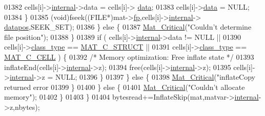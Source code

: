 \begin{DoxyCode}
{{{{{{{{01382                                 cells[i]->\hyperlink{group___m_a_t_a6e97e3ed9f40c49322c18561c2a94e92}{internal}->data = cells[i]->
      \hyperlink{group___m_a_t_a5672978efa230bbdecdf38ede781f7fa}{data};
01383                                 cells[i]->\hyperlink{group___m_a_t_a5672978efa230bbdecdf38ede781f7fa}{data} = NULL;
01384                             \}
01385                             (void)fseek((FILE*)mat->\hyperlink{struct__mat__t_a85f562e407ca9ad4d2a6e14f839432b7}{fp},cells[i]->\hyperlink{group___m_a_t_a6e97e3ed9f40c49322c18561c2a94e92}{internal}->
      \hyperlink{structmatvar__internal_afd3bfaab126a160bd6855563e1ea0a7e}{datapos},SEEK\_SET);
01386                         \} \textcolor{keywordflow}{else} \{
01387                             \hyperlink{group__mat__util_gaf51f2bfbb5580f575e4dd79757e2b80c}{Mat\_Critical}(\textcolor{stringliteral}{"Couldn't determine file position"});
01388                         \}
01389                         \textcolor{keywordflow}{if} ( cells[i]->\hyperlink{namespaceinternal}{internal}->data != NULL ||
01390                              cells[i]->\hyperlink{group___m_a_t_aff13035bf3265dd7d9425e5d40c839d4}{class\_type} == \hyperlink{group___m_a_t_ggad4d60ae7b709fc81bfd744fb4c857c40acb467c7749c80902b798134c729bb521}{MAT\_C\_STRUCT} ||
01391                              cells[i]->\hyperlink{group___m_a_t_aff13035bf3265dd7d9425e5d40c839d4}{class\_type} == \hyperlink{group___m_a_t_ggad4d60ae7b709fc81bfd744fb4c857c40a2f7abb47a1c51e248bd4e5e03cc81b08}{MAT\_C\_CELL} ) \{
01392                             \textcolor{comment}{/* Memory optimization: Free inflate state */}
01393                             inflateEnd(cells[i]->\hyperlink{namespaceinternal}{internal}->z);
01394                             free(cells[i]->\hyperlink{namespaceinternal}{internal}->z);
01395                             cells[i]->\hyperlink{group___m_a_t_a6e97e3ed9f40c49322c18561c2a94e92}{internal}->z = NULL;
01396                         \}
01397                     \} \textcolor{keywordflow}{else} \{
01398                         \hyperlink{group__mat__util_gaf51f2bfbb5580f575e4dd79757e2b80c}{Mat\_Critical}(\textcolor{stringliteral}{"inflateCopy returned error %
01399                     \}
01400                 \} \textcolor{keywordflow}{else} \{
01401                     \hyperlink{group__mat__util_gaf51f2bfbb5580f575e4dd79757e2b80c}{Mat\_Critical}(\textcolor{stringliteral}{"Couldn't allocate memory"});
01402                 \}
01403             \}
01404             bytesread+=InflateSkip(mat,matvar->\hyperlink{group___m_a_t_a6e97e3ed9f40c49322c18561c2a94e92}{internal}->z,nbytes);
}}}}}}}}}
\end{DoxyCode}
